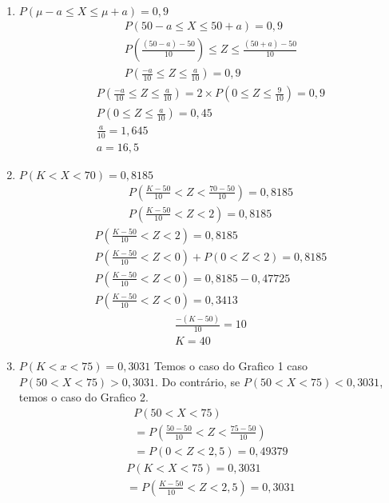 \begin{description}
\begin{description}
\begin{description}
\begin{enumerate}[label=(\alph*)]
  \item $P( \mu-a \leq X \leq \mu +a )=0,9$
\begin{align*}
  P(50- a \leq X \leq 50 +a)  = 0,9 \\
  P(\frac{(50-a)-50}{10}) \leq Z \leq \frac{(50+a)-50}{10} \\
  P(\frac{-a}{10} \leq Z \leq \frac{a}{10})=0,9 
\end{align*}
\begin{align*}
  P( \frac{-a}{10} \leq Z \leq \frac{a}{10} ) = 2 \times P(0 \leq Z \leq \frac{9}{10})= 0,9 \\
  P(0 \leq Z \leq \frac{a}{10})=0,45 \\
  \frac{a}{10}= 1,645 \\
  a = 16,5
\end{align*}
  \item $P(K< X <70)=0,8185$
    \begin{align*}
      P( \frac{K-50}{10} < Z < \frac{70-50}{10} ) = 0,8185 \\
      P(\frac{K-50}{10} < Z < 2) =0,8185
    \end{align*}
    \begin{align*}
      P( \frac{K-50}{10}<Z<2 )  = 0,8185 \\
      P( \frac{K-50}{10} < Z <0) + P(0 < Z <2) =0,8185 \\
      P(\frac{K-50}{10}<Z < 0) = 0,8185 - 0,47725 \\
      P( \frac{K-50}{10} < Z < 0 ) =0,3413
    \end{align*}
    \begin{align*}
      \frac{-(K-50)}{10} = 10 \\
      K= 40
    \end{align*}
  \item $P(K < x <75)= 0,3031$
    Temos o caso do Grafico 1 caso $P(50 < X < 75) > 0,3031$. Do contrário, se 
    $P(50 < X < 75) < 0,3031$, temos o caso do Grafico 2.
    \begin{align*}
      P(50 < X < 75)  \\
      =P(\frac{50-50}{10} < Z < \frac{75-50}{10}) \\
      =P(0 < Z < 2,5) = 0,49379
    \end{align*}
    \begin{align*}
      P(K < X < 75)  = 0,3031\\
      =P(\frac{K-50}{10}< Z <2,5)= 0,3031
    \end{align*}

\end{enumerate}
\end{description}
\end{description}
\end{description}
